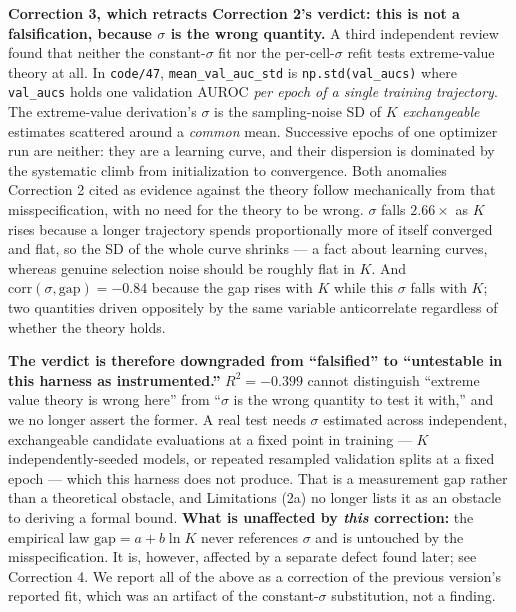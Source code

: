 \documentclass[10pt]{article} %
\begin{document}
\textbf{Correction 3, which retracts Correction 2's verdict: this is not a
falsification, because $\sigma$ is the wrong quantity.} A third independent
review found that neither the constant-$\sigma$ fit nor the per-cell-$\sigma$
refit tests extreme-value theory at all. In \texttt{code/47},
\texttt{mean\_val\_auc\_std} is \texttt{np.std(val\_aucs)} where
\texttt{val\_aucs} holds one validation AUROC \emph{per epoch of a single
training trajectory}. The extreme-value derivation's $\sigma$ is the
sampling-noise SD of $K$ \emph{exchangeable} estimates scattered around a
\emph{common} mean. Successive epochs of one optimizer run are neither: they
are a learning curve, and their dispersion is dominated by the systematic
climb from initialization to convergence. Both anomalies Correction 2 cited as
evidence against the theory follow mechanically from that misspecification,
with no need for the theory to be wrong. $\sigma$ falls $2.66\times$ as $K$
rises because a longer trajectory spends proportionally more of itself
converged and flat, so the SD of the whole curve shrinks --- a fact about
learning curves, whereas genuine selection noise should be roughly flat in
$K$. And $\mathrm{corr}(\sigma,\text{gap})=-0.84$ because the gap rises with
$K$ while this $\sigma$ falls with $K$; two quantities driven oppositely by the
same variable anticorrelate regardless of whether the theory holds.

\textbf{The verdict is therefore downgraded from ``falsified'' to
``untestable in this harness as instrumented.''} $R^2=-0.399$ cannot
distinguish ``extreme value theory is wrong here'' from ``$\sigma$ is the
wrong quantity to test it with,'' and we no longer assert the former. A real
test needs $\sigma$ estimated across independent, exchangeable candidate
evaluations at a fixed point in training --- $K$ independently-seeded models,
or repeated resampled validation splits at a fixed epoch --- which this
harness does not produce. That is a measurement gap rather than a theoretical
obstacle, and Limitations (2a) no longer lists it as an obstacle to deriving
a formal bound. \textbf{What is unaffected by \emph{this} correction:} the
empirical law $\text{gap}=a+b\ln K$ never references $\sigma$ and is untouched
by the misspecification. It is, however, affected by a separate defect found
later; see Correction 4. We report all of the above as a correction of the
previous version's reported fit, which was an artifact of the
constant-$\sigma$ substitution, not a finding.
\end{document}
